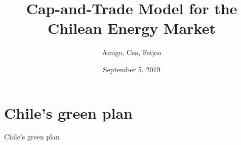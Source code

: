 \documentclass{beamer}
\title[Cap-and-Trade]{Cap-and-Trade Model for the Chilean Energy Market}
\author{Amigo, Cea, Feijoo}
\institute{EII - PUCV}
\date{September 5, 2019}
\begin{document}
\begin{frame}
  \titlepage
\end{frame}

\section{Chile's green plan}

\begin{frame}{Chile's green plan}

\end{frame}
\end{document}
